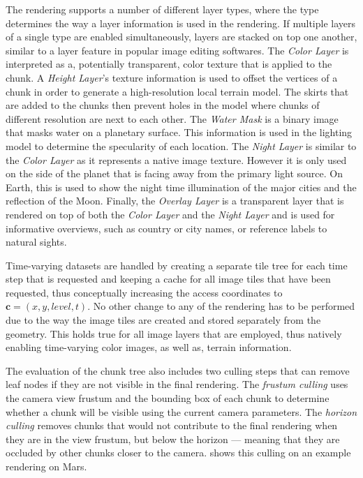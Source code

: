 The rendering supports a number of different layer types, where the type determines the way a layer information is used in the rendering.  If multiple layers of a single type are enabled simultaneously, layers are stacked on top one another, similar to a layer feature in popular image editing softwares.  The \emph{Color Layer} is interpreted as a, potentially transparent, color texture that is applied to the chunk.  A \emph{Height Layer}'s texture information is used to offset the vertices of a chunk in order to generate a high-resolution local terrain model.  The skirts that are added to the chunks then prevent holes in the model where chunks of different resolution are next to each other.  The \emph{Water Mask} is a binary image that masks water on a planetary surface.  This information is used in the lighting model to determine the specularity of each location.  The \emph{Night Layer} is similar to the \emph{Color Layer} as it represents a native image texture.  However it is only used on the side of the planet that is facing away from the primary light source.  On Earth, this is used to show the night time illumination of the major cities and the reflection of the Moon.  Finally, the \emph{Overlay Layer} is a transparent layer that is rendered on top of both the \emph{Color Layer} and the \emph{Night Layer} and is used for informative overviews, such as country or city names, or reference labels to natural sights.

Time-varying datasets are handled by creating a separate tile tree for each time step that is requested and keeping a cache for all image tiles that have been requested, thus conceptually increasing the access coordinates to $\textbf{c} = (x,y,level,t)$.  No other change to any of the rendering has to be performed due to the way the image tiles are created and stored separately from the geometry.  This holds true for all image layers that are employed, thus natively enabling time-varying color images, as well as, terrain information.

The evaluation of the chunk tree also includes two culling steps that can remove leaf nodes if they are not visible in the final rendering.  The \emph{frustum culling} uses the camera view frustum and the bounding box of each chunk to determine whether a chunk will be visible using the current camera parameters.  The \emph{horizon culling} removes chunks that would not contribute to the final rendering when they are in the view frustum, but below the horizon --- meaning that they are occluded by other chunks closer to the camera.   shows this culling on an example rendering on Mars.

